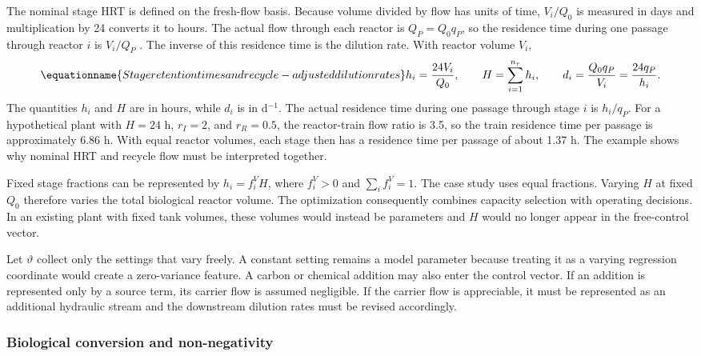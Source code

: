 The nominal stage HRT is defined on the fresh-flow basis. Because volume divided by flow has units of time, $V_i/Q_0$ is measured in days and multiplication by 24 converts it to hours. The actual flow through each reactor is $Q_P=Q_0q_P$, so the residence time during one passage through reactor $i$ is $V_i/Q_P$ \citep{Henze2008,Alex2008}. The inverse of this residence time is the dilution rate. With reactor volume $V_i$,
\begin{equation}
\equationname{Stage retention times and recycle-adjusted dilution rates}
h_i=\frac{24V_i}{Q_0},\qquad H=\sum_{i=1}^{n_r}h_i,\qquad
d_i=\frac{Q_0q_P}{V_i}=\frac{24q_P}{h_i}.
\label{eq:plant_residence}
\end{equation}
The quantities $h_i$ and $H$ are in hours, while $d_i$ is in d$^{-1}$. The actual residence time during one passage through stage $i$ is $h_i/q_P$. For a hypothetical plant with $H=24$ h, $r_I=2$, and $r_R=0.5$, the reactor-train flow ratio is 3.5, so the train residence time per passage is approximately 6.86 h. With equal reactor volumes, each stage then has a residence time per passage of about 1.37 h. The example shows why nominal HRT and recycle flow must be interpreted together.

Fixed stage fractions can be represented by $h_i=f_i^V H$, where $f_i^V>0$ and $\sum_i f_i^V=1$. The case study uses equal fractions. Varying $H$ at fixed $Q_0$ therefore varies the total biological reactor volume. The optimization consequently combines capacity selection with operating decisions. In an existing plant with fixed tank volumes, these volumes would instead be parameters and $H$ would no longer appear in the free-control vector.

Let $\vartheta$ collect only the settings that vary freely. A constant setting remains a model parameter because treating it as a varying regression coordinate would create a zero-variance feature. A carbon or chemical addition may also enter the control vector. If an addition is represented only by a source term, its carrier flow is assumed negligible. If the carrier flow is appreciable, it must be represented as an additional hydraulic stream and the downstream dilution rates must be revised accordingly.

\subsubsection{Biological conversion and non-negativity}

